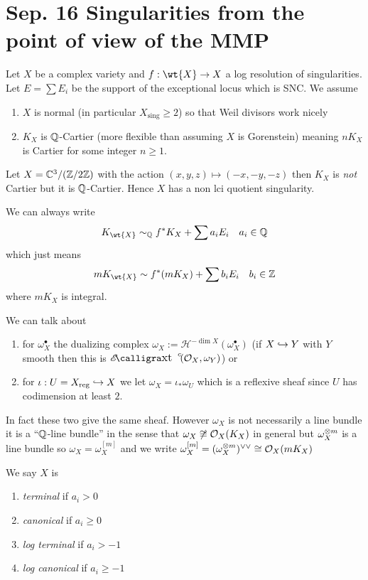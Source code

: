 \documentclass[12pt]{article}
\renewcommand{\cH}{\mathcal{H}}
\begin{document}
\section{Sep. 16 Singularities from the point of view of the MMP}

Let $X$ be a complex variety and $f : \wt{X} \to X$ a log resolution of singularities. Let $E = \sum E_i$ be the support of the exceptional locus which is SNC. We assume
\begin{enumerate}
\item $X$ is normal (in particular $X_{\text{sing}} \ge 2$) so that Weil divisors work nicely 
\item $K_X$ is $\mathbb{Q}$-Cartier (more flexible than assuming $X$ is Gorenstein) meaning $n K_X$ is Cartier for some integer $n \ge 1$. 
\end{enumerate}

\begin{exercise}
Let $X = \mathbb{C}^3 / (\mathbb{Z} / 2 \mathbb{Z})$ with the action $(x,y,z) \mapsto (-x,-y,-z)$ then $K_X$ is \textit{not} Cartier but it is $\mathbb{Q}$-Cartier. Hence $X$ has a non lci quotient singularity. 
\end{exercise}

We can always write 
\[ K_{\wt{X}} \sim_{\Q} f^* K_X + \sum a_i E_i \quad a_i \in \Q \]
which just means
\[ m K_{\wt{X}} \sim f^* (m K_X) + \sum b_i E_i \quad b_i \in \Z \]
where $m K_X$ is integral. 

\newcommand{\reg}{\mathrm{reg}}

\begin{rmk}
We can talk about 
\begin{enumerate}
\item for $\omega_X^\bullet$ the dualizing complex $\omega_X := \cH^{-\dim{X}}(\omega_X^\bullet)$ (if $X \hookrightarrow Y$ with $Y$ smooth then this is $\shExt{c}{}{\struct{X}}{\omega_Y}$) or
\item for $\iota : U = X_{\reg} \embed X$ we let $\omega_X = \iota_* \omega_{U}$ which is a reflexive sheaf since $U$ has codimension at least $2$.
\end{enumerate}
In fact these two give the same sheaf. However $\omega_X$ is not necessarily a line bundle it is a ``$\mathbb{Q}$-line bundle'' in the sense that $\omega_X \not\cong \mathcal{O}_{X}(K_X)$ in general but $\omega_X^{\otimes m}$ is a line bundle so $\omega_X = \omega_X^{[m]}$ and we write $\omega_X^{[m]} = (\omega_X^{\otimes m})^{\vee \vee} \cong \mathcal{O}_{X}(m K_X)$ 
\end{rmk}

\begin{defn}
We say $X$ is 
\begin{enumerate}
\item \textit{terminal} if $a_i > 0$
\item \textit{canonical} if $a_i \ge 0$
\item \textit{log terminal} if $a_i > -1$
\item \textit{log canonical} if $a_i \ge -1$
\end{enumerate}
\end{defn}
\end{document}
